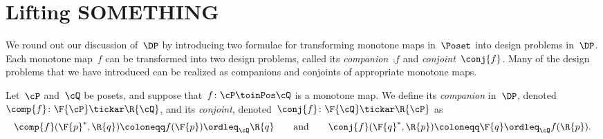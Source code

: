 \section{Lifting SOMETHING}
We round out our discussion of~$\DP$ by introducing two formulae for transforming monotone maps in~$\Poset$ into design problems in~$\DP$. Each monotone map~$f$ can be transformed into two design problems, called its \emph{companion}~$\comp{f}$ and \emph{conjoint}~$\conj{f}$. Many of the design problems that we have introduced can be realized as companions and conjoints of appropriate monotone maps.

\begin{definition}
\label{def:comp_conj}
Let~$\cP $ and~$\cQ $ be posets, and suppose that~$f\colon\cP \toinPos \cQ $ is a monotone map. We define its \emph{companion} in~$\DP$, denoted~$\comp{f}\colon \F{\cP} \tickar \R{\cQ}$,
and its \emph{conjoint}, denoted~$\conj{f}\colon \F{\cQ} \tickar \R{\cP}$ as
\begin{equation}
\comp{f}(\F{p}^*,\R{q})\coloneqq f(\F{p}) \ordleq_\cQ \R{q}
\qquad\text{and}\qquad
\conj{f}(\F{q}^*,\R{p})\coloneqq \F{q} \ordleq_\cQ f(\R{p}).
\end{equation}
\end{definition}

